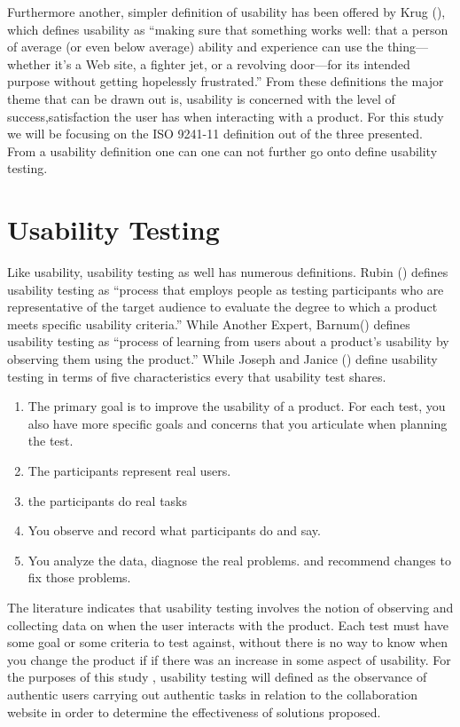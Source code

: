 \documentclass[a4paper,oneside,11pt]{report}
\begin{document}
Furthermore another, simpler definition of usability has been offered by Krug (\citeyear{krug2005}), which defines usability as \enquote {making sure that something works well: that a person of average (or even below average) ability and experience can use the 
thing—whether it’s a Web site, a fighter jet, or a revolving door—for its intended purpose without getting hopelessly frustrated.}
 From these definitions the major theme that can be drawn out is, usability is concerned with the level of success,satisfaction the user has when interacting with a product. For this study we will be focusing on the ISO 9241-11 definition out of the three presented.
 From a usability definition one can one can not further go onto define usability testing.
\section{Usability Testing}
Like usability, usability testing as well has numerous definitions. Rubin
(\citeyear{rubinchinsel2008}) defines usability testing as \enquote{process that employs people as testing participants who are representative of the target audience to evaluate the degree to which a product meets specific usability criteria.} While Another Expert, Barnum(\citeyear{barnum2002}) defines usability testing as \enquote{process of learning from users about a product’s usability by observing them using the product.} While  Joseph and Janice (\citeyear{jj1993}) define usability testing in terms of five characteristics every that usability test shares.
\quote 
	\begin{enumerate}
		\item The primary goal is to improve the usability of a product. For each test, you also have more specific goals and concerns that you articulate when planning the test.
  		\item The participants represent real users.
  		\item the participants do real tasks
  		\item You observe and record what participants do and say.
  		\item You analyze the data, diagnose the real problems. and recommend changes to fix those problems.
	\end{enumerate} 
\endquote
The literature indicates that usability testing involves the notion of observing and collecting data on when the user interacts with the product. Each test must have some goal or some criteria to test against, without there is no way to know when you change the product if if there was an increase in some aspect of usability.
For the purposes of this study , usability testing will defined as the observance of authentic users carrying out authentic tasks in relation to the collaboration website in order to determine the effectiveness of solutions proposed.



\printbibliography
\end{document}
